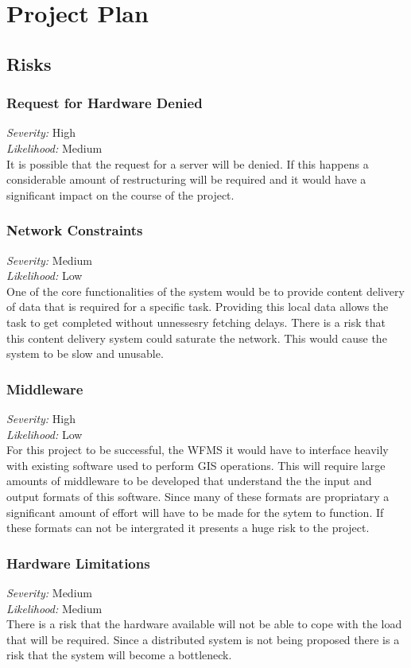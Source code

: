 \documentclass[12pt,a4paper]{article}
\begin{document}
\section{Project Plan}
\subsection{Risks}
\subsubsection*{Request for Hardware Denied}
\noindent \textit{Severity: } High \\
\noindent \textit{Likelihood: } Medium \\
It is possible that the request for a server will be denied. If this happens
a considerable amount of restructuring will be required and it would have a
significant impact on the course of the project.
\subsubsection*{Network Constraints}
\noindent \textit{Severity: } Medium \\
\noindent \textit{Likelihood: } Low \\
One of the core functionalities of the system would be to provide
content delivery of data that is required for a specific task. Providing
this local data allows the task to get completed without unnessesry
fetching delays. There is a risk that this content delivery system
could saturate the network. This would cause the system to be slow
and unusable.
\subsubsection*{Middleware}
\noindent \textit{Severity: } High \\
\noindent \textit{Likelihood: } Low \\
For this project to be successful, the WFMS it would have to interface
heavily with existing software used to perform GIS operations. This will
require large amounts of middleware to be developed that understand the
the input and output formats of this software. Since many of these
formats are propriatary a significant amount of effort will have to
be made for the sytem to function. If these formats can not be intergrated
it presents a huge risk to the project.
\subsubsection*{Hardware Limitations}
\noindent \textit{Severity: } Medium \\
\noindent \textit{Likelihood: } Medium \\
There is a risk that the hardware available will not be able to cope
with the load that will be required. Since a distributed system is
not being proposed there is a risk that the system will become a bottleneck.
\end{document}
